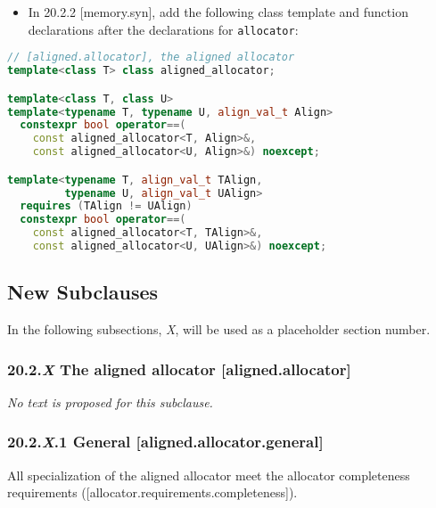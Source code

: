 \documentclass[11pt]{article}
\begin{document}
\begin{itemize}
	\item In 20.2.2 [memory.syn], add the following class template and function declarations after the declarations for \texttt{allocator}:
\end{itemize}

\begin{lstlisting}[language=C++, basicstyle=\small]
// [aligned.allocator], the aligned allocator
template<class T> class aligned_allocator;

template<class T, class U>
template<typename T, typename U, align_val_t Align>
  constexpr bool operator==(
    const aligned_allocator<T, Align>&, 
    const aligned_allocator<U, Align>&) noexcept;

template<typename T, align_val_t TAlign,
         typename U, align_val_t UAlign>
  requires (TAlign != UAlign)
  constexpr bool operator==(
    const aligned_allocator<T, TAlign>&, 
    const aligned_allocator<U, UAlign>&) noexcept;
\end{lstlisting}

\subsection{New Subclauses}

In the following subsections, \textit{X}, will be used as a placeholder section number.

\subsubsection{20.2.\textit{X}	The aligned allocator	[aligned.allocator]}

\textit{No text is proposed for this subclause.}

\subsubsection{20.2.\textit{X}.1	General	[aligned.allocator.general]}

All specialization of the aligned allocator meet the allocator completeness requirements ([allocator.requirements.completeness]).
\end{document}
